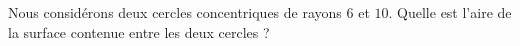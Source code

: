 
\begin{exercice}\label{exo2smath-0269}

    Nous considérons deux cercles concentriques de rayons \( 6\) et \( 10\). Quelle est l'aire de la surface contenue entre les deux cercles ?

\end{exercice}
